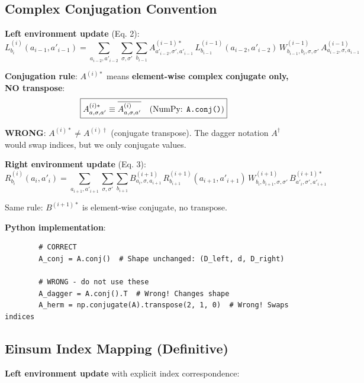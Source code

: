 \documentclass[aps,prb,onecolumn,scriptaddress]{revtex4-2}
\begin{document}
	\subsection{Complex Conjugation Convention}
	
	\textbf{Left environment update} (Eq. 2):
	\begin{equation}
		L^{(i)}_{b_i}(a_{i-1}, a'_{i-1}) = \sum_{a_{i-2}, a'_{i-2}} \sum_{\sigma, \sigma'} \sum_{b_{i-1}} A^{(i-1)*}_{a'_{i-2},\sigma',a'_{i-1}} \, L^{(i-1)}_{b_{i-1}}(a_{i-2}, a'_{i-2}) \, W^{(i-1)}_{b_{i-1},b_i,\sigma,\sigma'} \, A^{(i-1)}_{a_{i-2},\sigma,a_{i-1}}
		\end{equation}
		
		\textbf{Conjugation rule}: $A^{(i)*}$ means \textbf{element-wise complex conjugate only, NO transpose}:
		\begin{equation}
		\boxed{A^{(i)*}_{a,\sigma,a'} \equiv \overline{A^{(i)}_{a,\sigma,a'}} \quad \text{(NumPy: \texttt{A.conj()})}}
		\end{equation}
		
		\textbf{WRONG}: $A^{(i)*} \neq A^{(i)\dagger}$ (conjugate transpose). The dagger notation $A^\dagger$ would swap indices, but we only conjugate values.
		
		\textbf{Right environment update} (Eq. 3):
		\begin{equation}
		R^{(i)}_{b_i}(a_i, a'_i) = \sum_{a_{i+1}, a'_{i+1}} \sum_{\sigma, \sigma'} \sum_{b_{i+1}} B^{(i+1)}_{a_i,\sigma,a_{i+1}} \, R^{(i+1)}_{b_{i+1}}(a_{i+1}, a'_{i+1}) \, W^{(i+1)}_{b_i,b_{i+1},\sigma,\sigma'} \, B^{(i+1)*}_{a'_i,\sigma',a'_{i+1}}
		\end{equation}
		
		Same rule: $B^{(i+1)*}$ is element-wise conjugate, no transpose.
		
		\textbf{Python implementation}:
		\begin{verbatim}
		# CORRECT
		A_conj = A.conj()  # Shape unchanged: (D_left, d, D_right)
		
		# WRONG - do not use these
		A_dagger = A.conj().T  # Wrong! Changes shape
		A_herm = np.conjugate(A).transpose(2, 1, 0)  # Wrong! Swaps indices
		\end{verbatim}
		
		\subsection{Einsum Index Mapping (Definitive)}
		
		\textbf{Left environment update} with explicit index correspondence:
		
\end{document}
